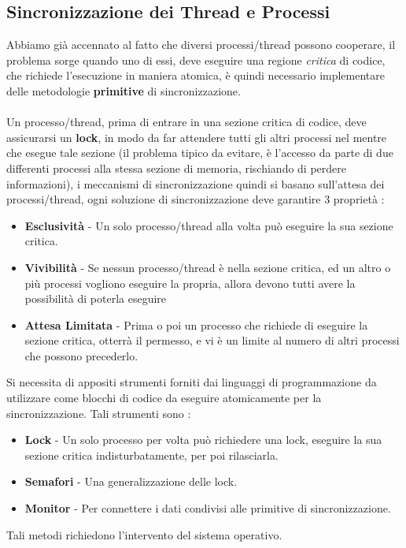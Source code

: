 \documentclass[12pt, letterpaper]{article}
\newcommand{\acc}{\\\hphantom{}\\}
\begin{document}
\subsection{Sincronizzazione dei Thread e Processi}
Abbiamo già accennato al fatto che diversi processi/thread possono cooperare, il problema sorge quando uno di essi, deve 
eseguire una regione \textit{critica} di codice, che richiede l'esecuzione in maniera atomica, è quindi necessario 
implementare delle metodologie \textbf{primitive} di sincronizzazione.\acc 
Un processo/thread, prima di entrare in una sezione critica di codice, deve assicurarsi un 
\textbf{lock}, in modo da far attendere tutti gli altri processi nel mentre che esegue tale sezione (il problema tipico da 
evitare, è l'accesso da parte di due differenti processi alla stessa sezione di memoria, rischiando di perdere informazioni), 
i meccanismi di sincronizzazione quindi si basano sull'attesa dei processi/thread, ogni soluzione di 
sincronizzazione deve garantire 3 proprietà : \begin{itemize}
    \item \textbf{Esclusività} - Un solo processo/thread alla volta può eseguire la sua sezione critica.
    \item \textbf{Vivibilità} - Se nessun processo/thread è nella sezione critica, ed un altro o più processi vogliono eseguire la propria, 
    allora devono tutti avere la possibilità di poterla eseguire 
    \item \textbf{Attesa Limitata} - Prima o poi un processo che richiede di eseguire la sezione critica, otterrà il permesso, 
     e vi è un limite al numero di altri processi che possono precederlo.
\end{itemize}
Si necessita di appositi strumenti forniti dai linguaggi di programmazione da utilizzare come 
blocchi di codice da eseguire atomicamente per la sincronizzazione. Tali strumenti sono : \begin{itemize}
    \item \textbf{Lock} - Un solo processo per volta può richiedere una lock, eseguire la sua sezione critica 
    indisturbatamente, per poi rilasciarla. 
    \item \textbf{Semafori} - Una generalizzazione delle lock. 
    \item \textbf{Monitor} - Per connettere i dati condivisi alle primitive di sincronizzazione.
\end{itemize}
Tali metodi richiedono l'intervento del sistema operativo. 
\end{document}
